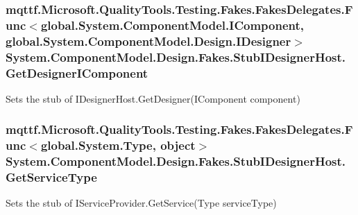 \hypertarget{class_system_1_1_component_model_1_1_design_1_1_fakes_1_1_stub_i_designer_host_a0b6b680c2ff6b92b3961fe44d4f22c78}{
\subsubsection[{Get\-Designer\-I\-Component}]{\setlength{\rightskip}{0pt plus 5cm}mqttf.\-Microsoft.\-Quality\-Tools.\-Testing.\-Fakes.\-Fakes\-Delegates.\-Func$<$global.\-System.\-Component\-Model.\-I\-Component, global.\-System.\-Component\-Model.\-Design.\-I\-Designer$>$ System.\-Component\-Model.\-Design.\-Fakes.\-Stub\-I\-Designer\-Host.\-Get\-Designer\-I\-Component}}\label{class_system_1_1_component_model_1_1_design_1_1_fakes_1_1_stub_i_designer_host_a0b6b680c2ff6b92b3961fe44d4f22c78}


Sets the stub of I\-Designer\-Host.\-Get\-Designer(\-I\-Component component)

\hypertarget{class_system_1_1_component_model_1_1_design_1_1_fakes_1_1_stub_i_designer_host_aba285626157fda6ca344b0294a61f534}{
\subsubsection[{Get\-Service\-Type}]{\setlength{\rightskip}{0pt plus 5cm}mqttf.\-Microsoft.\-Quality\-Tools.\-Testing.\-Fakes.\-Fakes\-Delegates.\-Func$<$global.\-System.\-Type, object$>$ System.\-Component\-Model.\-Design.\-Fakes.\-Stub\-I\-Designer\-Host.\-Get\-Service\-Type}}\label{class_system_1_1_component_model_1_1_design_1_1_fakes_1_1_stub_i_designer_host_aba285626157fda6ca344b0294a61f534}


Sets the stub of I\-Service\-Provider.\-Get\-Service(\-Type service\-Type)

